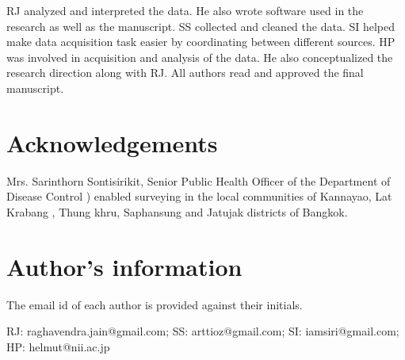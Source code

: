 \documentclass{bmcart}
\begin{document}
\begin{backmatter}
RJ analyzed and interpreted the data. He also wrote software used in the research as well as the manuscript. SS collected and cleaned the data. SI helped make data acquisition task easier by coordinating between different sources. HP was involved in acquisition and analysis of the data. He also conceptualized the research direction along with RJ. All authors read and approved the final manuscript. 
    
      
\section*{Acknowledgements}
Mrs. Sarinthorn Sontisirikit, Senior Public Health Officer of the Department of Disease Control ) enabled surveying in the local communities of Kannayao, Lat Krabang , Thung khru, Saphansung and Jatujak districts of Bangkok.

\section*{Author's information}

The email id of each author is provided against their initials.

RJ: raghavendra.jain@gmail.com;
SS: arttioz@gmail.com; 
SI: iamsiri@gmail.com;
HP: helmut@nii.ac.jp
  

\clearpage

%





\end{backmatter}
\end{document}

